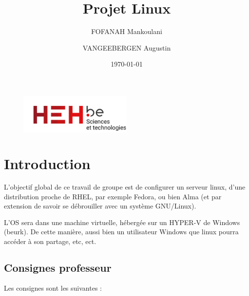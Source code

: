 \documentclass{article}
\title{Projet Linux}
\author{FOFANAH Mankoulani \and VANGEEBERGEN Augustin}
\date{\today}
\begin{document}
	
	\maketitle
	
	\begin{figure}[h]
		\centering
		\includegraphics[width=0.5\textwidth]{logo.png}

		\label{fig:your_label}
	\end{figure}
	
	\newpage


	\tableofcontents
	\newpage
	
	\section{Introduction}
	
	L'objectif global de ce travail de groupe est de configurer un serveur linux, d'une distribution proche de RHEL, par exemple Fedora, ou bien Alma (et par extension de savoir se débrouiller avec un système GNU/Linux). 
	
	L'OS sera dans une machine virtuelle, hébergée sur un HYPER-V de Windows (beurk). De cette manière, aussi bien un utilisateur Windows que linux pourra accéder à  son partage, etc, ect.
	
	\subsection{Consignes professeur}
	
	Les consignes sont les suivantes : 
	
\end{document}
